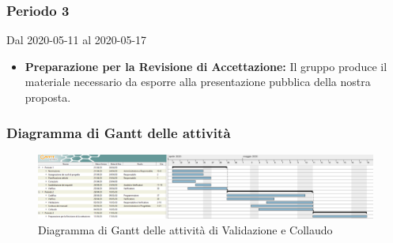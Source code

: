 \subsubsection{Periodo 3} 
Dal 2020-05-11 al 2020-05-17
\begin{itemize}
	\item \textbf{Preparazione per la Revisione di Accettazione:} Il gruppo produce il materiale necessario da esporre alla presentazione pubblica della nostra proposta.
\end{itemize}


\newpage
\begin{landscape}
	\subsubsection{Diagramma di Gantt delle attività}
	\pagestyle{empty}
	\begin{figure}[h]
		
		\begin{center}	
			\includegraphics[scale=1.6]{Sezioni/DiagrammiGantt/Validazione.png}
		\end{center}
	\caption{Diagramma di Gantt delle attività di Validazione e Collaudo}	
	\end{figure}
\end{landscape}